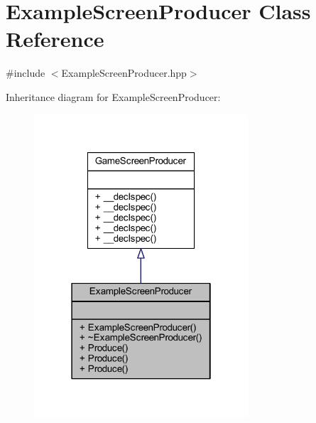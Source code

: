 \hypertarget{class_example_screen_producer}{\section{Example\-Screen\-Producer Class Reference}
\label{class_example_screen_producer}
}


{\ttfamily \#include $<$Example\-Screen\-Producer.\-hpp$>$}



Inheritance diagram for Example\-Screen\-Producer\-:\nopagebreak
\begin{figure}[H]
\begin{center}
\leavevmode
\includegraphics[width=226pt]{class_example_screen_producer__inherit__graph}
\end{center}
\end{figure}


